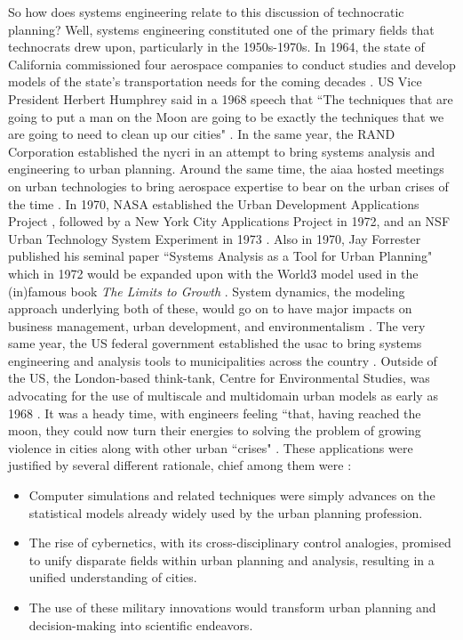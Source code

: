 So how does systems engineering relate to this discussion of technocratic planning? Well, systems engineering constituted one of the primary fields that technocrats drew upon, particularly in the 1950s-1970s. In 1964, the state of California commissioned four aerospace companies to conduct studies and develop models of the state's transportation needs for the coming decades \cite{smithSystemsApproachUrban1968}. US Vice President Herbert Humphrey said in a 1968 speech that ``The techniques that are going to put a man on the Moon are going to be exactly the techniques that we are going to need to clean up our cities" \cite{lightWarfareWelfareDefense2005}. In the same year, the RAND Corporation established the \ac{nycri} in an attempt to bring systems analysis and engineering to urban planning. Around the same time, the \ac{aiaa} hosted meetings on urban technologies to bring aerospace expertise to bear on the urban crises of the time \cite{lightWarfareWelfareDefense2005}. In 1970, NASA established the Urban Development Applications Project \cite{fosterUrbanDevelopmentApplications1970}, followed by a New York City Applications Project in 1972, and an NSF Urban Technology System Experiment in 1973 \cite{karenTechnologyTransferNew1973}. Also in 1970, Jay Forrester published his seminal paper ``Systems Analysis as a Tool for Urban Planning" \cite{forresterSystemsAnalysisTool1970} which in 1972 would be expanded upon with the World3 model used in the (in)famous book \textit{The Limits to Growth} \cite{meadowsLimitsGrowth1972}. System dynamics, the modeling approach underlying both of these, would go on to have major impacts on business management, urban development, and environmentalism \cite{forresterSystemDynamicsPersonal2007a}. The very same year, the US federal government established the \ac{usac} to bring systems engineering and analysis tools to municipalities across the country \cite{kraemerRequiemUSAC1979}. Outside of the US, the London-based think-tank, Centre for Environmental Studies, was advocating for the use of multiscale and multidomain urban models as early as 1968 \cite{wilsonModellingSystemsAnalysis1968}. It was a heady time, with engineers feeling ``that, having reached the moon, they could now turn their energies to solving the problem of growing violence in cities along with other urban ``crises" \cite[\textsuperscript{(p33)}]{mazza2017}. These applications were justified by several different rationale, chief among them were \cite{lightWarfareWelfareDefense2005}: 

\begin{itemize} \setlength{\itemsep}{0pt} \setlength{\parskip}{0pt} 
	\item{Computer simulations and related techniques were simply advances on the statistical models already widely used by the urban planning profession.}
	\item{The rise of cybernetics, with its cross-disciplinary control analogies, promised to unify disparate fields within urban planning and analysis, resulting in a unified understanding of cities.}
	\item{The use of these military innovations would transform urban planning and decision-making into scientific endeavors.}
\end{itemize}


